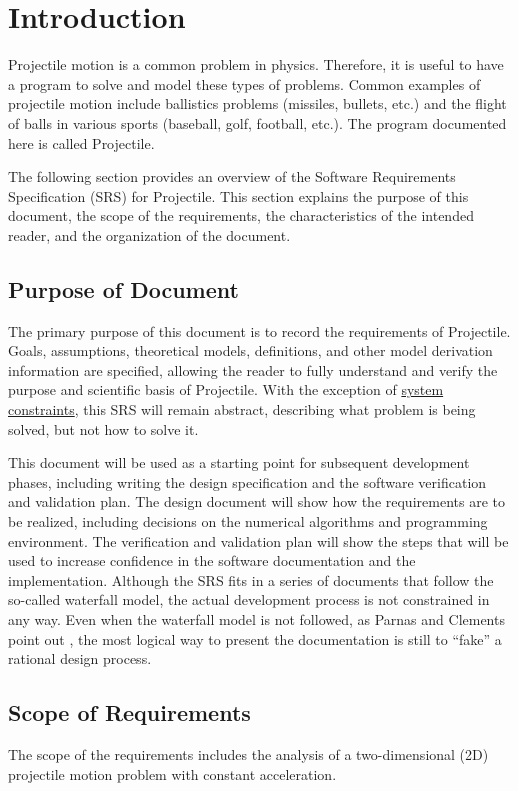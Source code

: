 \documentclass[12pt]{article}
\begin{document}
\section{Introduction}
\label{Sec:Intro}
Projectile motion is a common problem in physics. Therefore, it is useful to have a program to solve and model these types of problems. Common examples of projectile motion include ballistics problems (missiles, bullets, etc.) and the flight of balls in various sports (baseball, golf, football, etc.). The program documented here is called Projectile.

The following section provides an overview of the Software Requirements Specification (SRS) for Projectile. This section explains the purpose of this document, the scope of the requirements, the characteristics of the intended reader, and the organization of the document.

\subsection{Purpose of Document}
\label{Sec:DocPurpose}
The primary purpose of this document is to record the requirements of Projectile. Goals, assumptions, theoretical models, definitions, and other model derivation information are specified, allowing the reader to fully understand and verify the purpose and scientific basis of Projectile. With the exception of \hyperref[Sec:SysConstraints]{system constraints}, this SRS will remain abstract, describing what problem is being solved, but not how to solve it.

This document will be used as a starting point for subsequent development phases, including writing the design specification and the software verification and validation plan. The design document will show how the requirements are to be realized, including decisions on the numerical algorithms and programming environment. The verification and validation plan will show the steps that will be used to increase confidence in the software documentation and the implementation. Although the SRS fits in a series of documents that follow the so-called waterfall model, the actual development process is not constrained in any way. Even when the waterfall model is not followed, as Parnas and Clements point out \cite{parnasClements1986}, the most logical way to present the documentation is still to ``fake'' a rational design process.

\subsection{Scope of Requirements}
\label{Sec:ReqsScope}
The scope of the requirements includes the analysis of a two-dimensional (2D) projectile motion problem with constant acceleration.
\end{document}

